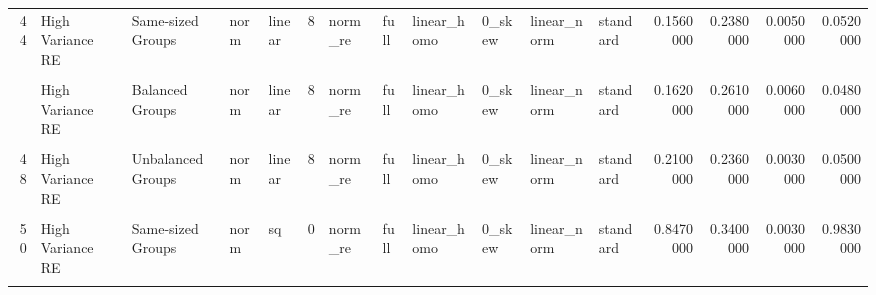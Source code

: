 \documentclass[12pt]{article}
\begin{document}
\begin{table}
{\begin{tabular}[t]{rllllrllllllrrrr}
44 & High Variance RE & Same-sized Groups & norm & linear & 8 & norm\_re & full & linear\_homo & 0\_skew & linear\_norm & standard & 0.1560000 & 0.2380000 & 0.0050000 & 0.0520000\\
\cellcolor{gray!6}{45} & \cellcolor{gray!6}{High Variance Error} & \cellcolor{gray!6}{Balanced Groups} & \cellcolor{gray!6}{norm} & \cellcolor{gray!6}{linear} & \cellcolor{gray!6}{8} & \cellcolor{gray!6}{norm\_re} & \cellcolor{gray!6}{full} & \cellcolor{gray!6}{linear\_homo} & \cellcolor{gray!6}{0\_skew} & \cellcolor{gray!6}{linear\_norm} & \cellcolor{gray!6}{standard} & \cellcolor{gray!6}{0.0510000} & \cellcolor{gray!6}{0.2220000} & \cellcolor{gray!6}{0.2330000} & \cellcolor{gray!6}{0.0540000}\\
\addlinespace
46 & High Variance RE & Balanced Groups & norm & linear & 8 & norm\_re & full & linear\_homo & 0\_skew & linear\_norm & standard & 0.1620000 & 0.2610000 & 0.0060000 & 0.0480000\\
\cellcolor{gray!6}{47} & \cellcolor{gray!6}{High Variance Error} & \cellcolor{gray!6}{Unbalanced Groups} & \cellcolor{gray!6}{norm} & \cellcolor{gray!6}{linear} & \cellcolor{gray!6}{8} & \cellcolor{gray!6}{norm\_re} & \cellcolor{gray!6}{full} & \cellcolor{gray!6}{linear\_homo} & \cellcolor{gray!6}{0\_skew} & \cellcolor{gray!6}{linear\_norm} & \cellcolor{gray!6}{standard} & \cellcolor{gray!6}{0.0500000} & \cellcolor{gray!6}{0.2230000} & \cellcolor{gray!6}{0.2260000} & \cellcolor{gray!6}{0.0340000}\\
48 & High Variance RE & Unbalanced Groups & norm & linear & 8 & norm\_re & full & linear\_homo & 0\_skew & linear\_norm & standard & 0.2100000 & 0.2360000 & 0.0030000 & 0.0500000\\
\cellcolor{gray!6}{49} & \cellcolor{gray!6}{High Variance Error} & \cellcolor{gray!6}{Same-sized Groups} & \cellcolor{gray!6}{norm} & \cellcolor{gray!6}{sq} & \cellcolor{gray!6}{0} & \cellcolor{gray!6}{norm\_re} & \cellcolor{gray!6}{full} & \cellcolor{gray!6}{linear\_homo} & \cellcolor{gray!6}{0\_skew} & \cellcolor{gray!6}{linear\_norm} & \cellcolor{gray!6}{standard} & \cellcolor{gray!6}{0.0490000} & \cellcolor{gray!6}{0.0890000} & \cellcolor{gray!6}{0.0990000} & \cellcolor{gray!6}{0.5440000}\\
50 & High Variance RE & Same-sized Groups & norm & sq & 0 & norm\_re & full & linear\_homo & 0\_skew & linear\_norm & standard & 0.8470000 & 0.3400000 & 0.0030000 & 0.9830000\\
\addlinespace
\cellcolor{gray!6}{51} & \cellcolor{gray!6}{High Variance Error} & \cellcolor{gray!6}{Balanced Groups} & \cellcolor{gray!6}{norm} & \cellcolor{gray!6}{sq} & \cellcolor{gray!6}{0} & \cellcolor{gray!6}{norm\_re} & \cellcolor{gray!6}{full} & \cellcolor{gray!6}{linear\_homo} & \cellcolor{gray!6}{0\_skew} & \cellcolor{gray!6}{linear\_norm} & \cellcolor{gray!6}{standard} & \cellcolor{gray!6}{0.0700000} & \cellcolor{gray!6}{0.1090000} & \cellcolor{gray!6}{0.0950000} & \cellcolor{gray!6}{0.5280000}\\

\end{tabular}}
\end{table}
\end{document}
